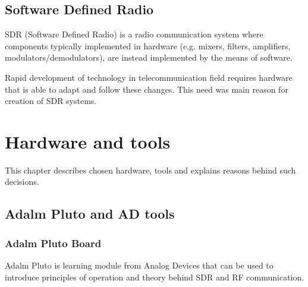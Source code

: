 \documentclass[en,printmode]{mgr}
\begin{document}
	\section{Software Defined Radio}
		SDR (Software Defined Radio) is a radio communication system where components typically implemented in hardware 
		(e.g. mixers, filters, amplifiers, modulators/demodulators), are instead implemented by the means of software.
		
		Rapid development of technology in telecommunication field requires hardware that is able to adapt and follow these changes. 
		This need was main reason for creation of SDR systems. 
		
		
\chapter{Hardware and tools}
	This chapter describes chosen hardware, tools and explains reasons behind such decisions.
	\section{Adalm Pluto and AD tools}
		\subsection*{Adalm Pluto Board}
			Adalm Pluto is learning module from Analog Devices that can be used to introduce 
			principles of operation and theory behind SDR and RF communication.
			
\end{document}
